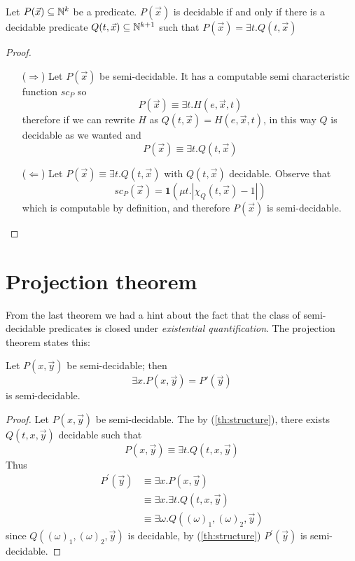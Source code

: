 \begin{theorem}\label{th:structure}
  Let $ P(\vec{x}) \subseteq \mathbb{N}^k $ be a predicate.
  $ P(\vec{x})$ is decidable if and only if there is a decidable predicate $
  Q(t,\vec{x}) \subseteq \mathbb{N}^{k+1} $ such that $ P(\vec{x}) = \exists
  t. Q(t,\vec{x}) $
  \begin{proof}
    \begin{itemize}
    \item[($\Rightarrow$)] Let $P(\vec{x})$ be
      semi-decidable. It has a computable semi characteristic function
      $sc_P$ so
      \[
        P(\vec{x}) \equiv \exists t . H(e,\vec{x}, t)
      \]
      therefore if we can rewrite $H$ as
      $Q(t, \vec{x}) = H(e,\vec{x}, t)$, in this way $Q$ is decidable as
      we wanted and \[P(\vec{x}) \equiv \exists t . Q(t, \vec{x})\]

    \item[($\Leftarrow$)] Let
      \(P(\vec{x}) \equiv \exists t . Q(t, \vec{x})\) with $Q(t, \vec{x})$
      decidable. Observe that
      \[
        sc_P(\vec{x}) = \mathbf{1}(\mu t . |\chi_Q(t,\vec{x}) - 1|)
      \]
      which is computable by definition, and therefore $P(\vec{x})$ is
      semi-decidable.
    \end{itemize}
  \end{proof}
\end{theorem}

\section {Projection theorem}

From the last theorem we had a hint about the fact that the class of
semi-decidable predicates is closed under \emph{existential
  quantification}. The projection theorem states this:
\begin{theorem}
  Let $ P(x,\vec{y}) $ be semi-decidable; then
  \[
    \exists x.P(x,\vec{y}) = P'(\vec{y})
  \]
  is semi-decidable.

  \begin{proof}
    Let $P(x,\vec{y})$ be semi-decidable. The by
    (\ref{th:structure}), there exists $Q(t,x,\vec{y})$ decidable such that
    \[
      P(x, \vec{y}) \equiv \exists t . Q(t,x,\vec{y})
    \]
    Thus 
    \begin{align*}
      P^\prime(\vec{y}) &\equiv \exists x . P(x, \vec{y}) \\
        &\equiv \exists x .\exists t .
        Q(t,x,\vec{y}) \\
        &\equiv \exists \omega . Q((\omega)_1, (\omega)_2, \vec{y})
    \end{align*}    
    since $Q((\omega)_1, (\omega)_2, \vec{y})$ is decidable,
    by (\ref{th:structure}) $P^\prime(\vec{y})$ is
    semi-decidable.
  \end{proof}
\end{theorem}

